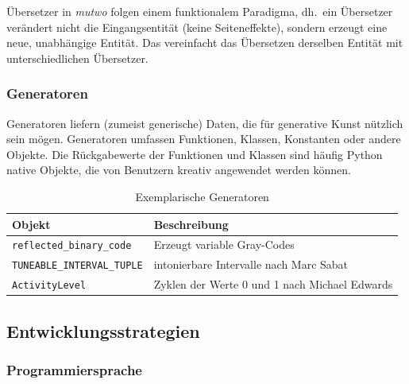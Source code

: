 \documentclass[12pt,a4paper,ngerman]{article}
\begin{document}
\smallskip


Übersetzer in \emph{mutwo} folgen einem funktionalem Paradigma, dh.\ ein Übersetzer verändert nicht die Eingangsentität (keine Seiteneffekte), sondern erzeugt eine neue, unabhängige Entität.
Das vereinfacht das Übersetzen derselben Entität mit unterschiedlichen Übersetzer.

\subsubsection{Generatoren}

Generatoren liefern (zumeist generische) Daten, die für generative Kunst nützlich sein mögen.
Generatoren umfassen Funktionen, Klassen, Konstanten oder andere Objekte.
Die Rückgabewerte der Funktionen und Klassen sind häufig Python native Objekte, die von Benutzern kreativ angewendet werden können.

\begin{table}[h!]
    \begin{center}
        \begin{tabular}{l l} 
            \hline
            Objekt & Beschreibung \\ [0.5ex] 
            \hline\hline
            \texttt{reflected\_binary\_code} & Erzeugt variable Gray-Codes \\
            \texttt{TUNEABLE\_INTERVAL\_TUPLE} & intonierbare Intervalle nach Marc Sabat \\
            \texttt{ActivityLevel} & Zyklen der Werte 0 und 1 nach Michael Edwards \\ [1ex] 
            \hline
        \end{tabular}
    \end{center}

    \caption{Exemplarische Generatoren}
\end{table}


\subsection{Entwicklungsstrategien}

\subsubsection{Programmiersprache}
\end{document}
